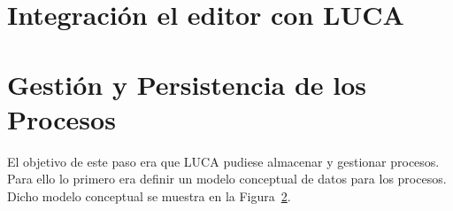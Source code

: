 
\section{Integración el editor con LUCA}






\section{Gestión y Persistencia de los Procesos}

El objetivo de este paso era que LUCA pudiese almacenar y gestionar procesos. Para ello lo primero era definir un modelo conceptual de datos para los procesos. Dicho modelo conceptual se muestra en la Figura~\ref{}.




